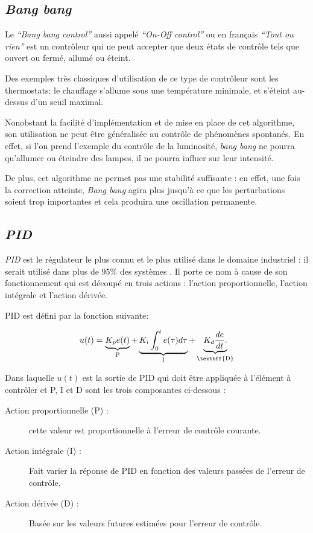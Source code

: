 \documentclass[a4paper,10pt]{report}
\begin{document}
\subsection{\emph{Bang bang}}
Le \emph{``Bang bang control''} aussi appelé \emph{``On-Off control''} ou en français \emph{``Tout ou rien''} est un contrôleur qui ne peut accepter que deux états de contrôle tels que ouvert ou fermé, allumé ou éteint.

Des exemples très classiques d'utilisation de ce type de contrôleur sont les thermostats: le chauffage s'allume sous une température minimale, et s'éteint au-dessus d'un seuil maximal.

Nonobstant la facilité d'implémentation et de mise en place de cet algorithme, son utilisation ne peut être généralisée au contrôle de phénomènes spontanés. En effet, si l'on prend l'exemple du contrôle de la luminosité, \emph{bang bang} ne pourra qu'allumer ou éteindre des lampes, il ne pourra influer sur leur intensité. \cite{Burghes2004}

De plus, cet algorithme ne permet pas une stabilité suffisante : en effet, une fois la correction atteinte, \emph{Bang bang} agira plus jusqu'à ce que les perturbations soient trop importantes et cela produira une oscillation permanente. \cite{ballard1993pid}


\subsection{\emph{PID}}
\label{PID}

\emph{PID} est le régulateur le plus connu et le plus utilisé dans le domaine industriel : il serait utilisé dans plus de 95\% des systèmes \cite{Kinnaert2013, aastrom2002control}.
Il porte ce nom à cause de son fonctionnement qui est découpé en trois actions : l'action proportionnelle, l'action intégrale et l'action dérivée.

PID est défini par la fonction suivante:

\begin{equation}
  u(t) =
    \underbrace{K_p e(t)}_{\text{P}} +
    \underbrace{K_i \int_{0}^{t} e(\tau) d\tau}_{\text{I}} +
    \underbrace{K_d \frac{de}{dt}.}_{\text{\textbff{D}}}
\end{equation}

Dans laquelle $u(t)$ est la sortie de PID qui doit être appliquée à l'élément à contrôler et P, I et D sont les trois composantes ci-dessous :
\begin{description} %
\item[Action proportionnelle (P) :]
    cette valeur est proportionnelle à l'erreur de contrôle courante.
\item[Action intégrale (I) :]
    Fait varier la réponse de PID en fonction des valeurs passées de l'erreur de contrôle.
\item[Action dérivée (D) :]
    Basée sur les valeurs futures estimées pour l'erreur de contrôle.
\end{description}
\end{document}
